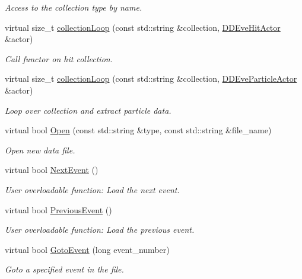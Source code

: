 \begin{DoxyCompactItemize}
\begin{DoxyCompactList}\small\item\em Access to the collection type by name. \end{DoxyCompactList}\item 
virtual size\+\_\+t \hyperlink{class_d_d4hep_1_1_l_c_i_o_event_handler_adbb8d55fec6962d692f19730fc5224fb}{collection\+Loop} (const std\+::string \&collection, \hyperlink{struct_d_d4hep_1_1_d_d_eve_hit_actor}{D\+D\+Eve\+Hit\+Actor} \&actor)
\begin{DoxyCompactList}\small\item\em Call functor on hit collection. \end{DoxyCompactList}\item 
virtual size\+\_\+t \hyperlink{class_d_d4hep_1_1_l_c_i_o_event_handler_aa741ce2b60b3eddd4ddeb1fba6197a86}{collection\+Loop} (const std\+::string \&collection, \hyperlink{struct_d_d4hep_1_1_d_d_eve_particle_actor}{D\+D\+Eve\+Particle\+Actor} \&actor)
\begin{DoxyCompactList}\small\item\em Loop over collection and extract particle data. \end{DoxyCompactList}\item 
virtual bool \hyperlink{class_d_d4hep_1_1_l_c_i_o_event_handler_a67214b5a7675de7d634ac7c1d0cd2c7c}{Open} (const std\+::string \&type, const std\+::string \&file\+\_\+name)
\begin{DoxyCompactList}\small\item\em Open new data file. \end{DoxyCompactList}\item 
virtual bool \hyperlink{class_d_d4hep_1_1_l_c_i_o_event_handler_a14966ef5f33d58b1f0f3b952a334d48f}{Next\+Event} ()
\begin{DoxyCompactList}\small\item\em User overloadable function\+: Load the next event. \end{DoxyCompactList}\item 
virtual bool \hyperlink{class_d_d4hep_1_1_l_c_i_o_event_handler_a178458d67dd58d3f5d701795fcadcd2e}{Previous\+Event} ()
\begin{DoxyCompactList}\small\item\em User overloadable function\+: Load the previous event. \end{DoxyCompactList}\item 
virtual bool \hyperlink{class_d_d4hep_1_1_l_c_i_o_event_handler_af7089e4660ace0f0a4da544bb39660e5}{Goto\+Event} (long event\+\_\+number)
\begin{DoxyCompactList}\small\item\em Goto a specified event in the file. \end{DoxyCompactList}\end{DoxyCompactItemize}
